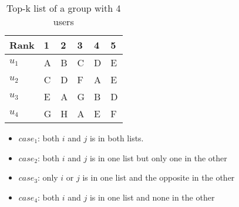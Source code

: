 \begin{frame}[t]
\begin{columns}
\begin{column}{0.5\textwidth}
\footnotesize
\vspace{-2.5cm}
\begin{table}
\captionsetup{font=footnotesize}
\begin{tabular}{|l|lllll|} \hline
Rank  & 1 & 2 & 3 & 4 & 5 \\\hline
$u_1$ & A & B & C & D & E \\
$u_2$ & C & D & F & A & E \\
$u_3$ & E & A & G & B & D \\
$u_4$ & G & H & A & E & F\\\hline
\end{tabular}
\caption{Top-k list of a group with 4 users}
\end{table}
\normalsize
\begin{itemize}
\item $case_1$: both $i$ and $j$ is in both lists.
\item $case_2$: both $i$ and $j$ is in one list but only one in the other
\item $case_3$: only $i$ or $j$ is in one list and the opposite in the other
\item $case_4$: both $i$ and $j$ is in one list and none in the other
\end{itemize}

\end{column}
\end{columns}
\end{frame}